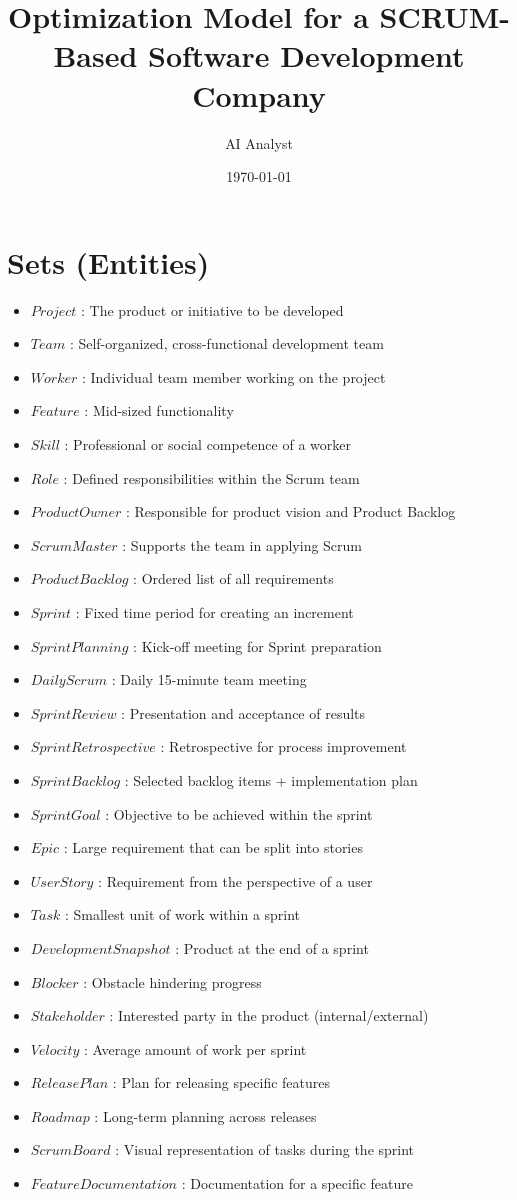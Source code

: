 \documentclass[11pt]{article}
\title{Optimization Model for a SCRUM-Based Software Development Company}
\author{AI Analyst}
\date{\today}
\begin{document}
\maketitle
\tableofcontents

\section{Sets (Entities)}
\begin{itemize}
    \item $Project$ : The product or initiative to be developed
    \item $Team$ : Self-organized, cross-functional development team
    \item $Worker$ : Individual team member working on the project
    \item $Feature$ : Mid-sized functionality
    \item $Skill$ : Professional or social competence of a worker
    \item $Role$ : Defined responsibilities within the Scrum team
    \item $ProductOwner$ : Responsible for product vision and Product Backlog
    \item $ScrumMaster$ : Supports the team in applying Scrum
    \item $ProductBacklog$ : Ordered list of all requirements
    \item $Sprint$ : Fixed time period for creating an increment
    \item $SprintPlanning$ : Kick-off meeting for Sprint preparation
    \item $DailyScrum$ : Daily 15-minute team meeting
    \item $SprintReview$ : Presentation and acceptance of results
    \item $SprintRetrospective$ : Retrospective for process improvement
    \item $SprintBacklog$ : Selected backlog items + implementation plan
    \item $SprintGoal$ : Objective to be achieved within the sprint
    \item $Epic$ : Large requirement that can be split into stories
    \item $UserStory$ : Requirement from the perspective of a user
    \item $Task$ : Smallest unit of work within a sprint
    \item $DevelopmentSnapshot$ : Product at the end of a sprint
    \item $Blocker$ : Obstacle hindering progress
    \item $Stakeholder$ : Interested party in the product (internal/external)
    \item $Velocity$ : Average amount of work per sprint
    \item $ReleasePlan$ : Plan for releasing specific features
    \item $Roadmap$ : Long-term planning across releases
    \item $ScrumBoard$ : Visual representation of tasks during the sprint
    \item $FeatureDocumentation$ : Documentation for a specific feature
\end{itemize}
\end{document}
